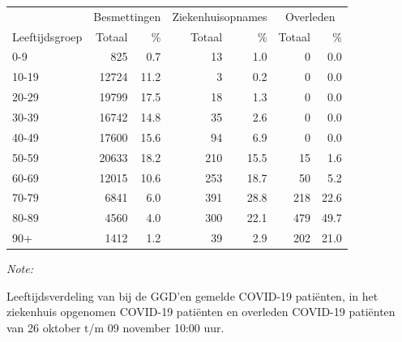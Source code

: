 \documentclass[
  english,
  man,floatsintext]{apa6}
\begin{document}
\begin{table}[H]
\centering\begingroup\fontsize{11}{13}\selectfont

\begin{threeparttable}
\begin{tabular}{lrrrrrr}
\toprule
\multicolumn{1}{c}{ } & \multicolumn{2}{c}{Besmettingen} & \multicolumn{2}{c}{Ziekenhuisopnames} & \multicolumn{2}{c}{Overleden} \\
\cmidrule(l{3pt}r{3pt}){2-3} \cmidrule(l{3pt}r{3pt}){4-5} \cmidrule(l{3pt}r{3pt}){6-7}
Leeftijdsgroep & Totaal & \% & Totaal & \% & Totaal & \%\\
\midrule
0-9 & 825 & 0.7 & 13 & 1.0 & 0 & 0.0\\
10-19 & 12724 & 11.2 & 3 & 0.2 & 0 & 0.0\\
20-29 & 19799 & 17.5 & 18 & 1.3 & 0 & 0.0\\
30-39 & 16742 & 14.8 & 35 & 2.6 & 0 & 0.0\\
40-49 & 17600 & 15.6 & 94 & 6.9 & 0 & 0.0\\
50-59 & 20633 & 18.2 & 210 & 15.5 & 15 & 1.6\\
60-69 & 12015 & 10.6 & 253 & 18.7 & 50 & 5.2\\
70-79 & 6841 & 6.0 & 391 & 28.8 & 218 & 22.6\\
80-89 & 4560 & 4.0 & 300 & 22.1 & 479 & 49.7\\
90+ & 1412 & 1.2 & 39 & 2.9 & 202 & 21.0\\
\bottomrule
\end{tabular}
\begin{tablenotes}
\item \textit{Note: } 
\item Leeftijdsverdeling van bij de GGD’en gemelde COVID-19 patiënten, in het ziekenhuis opgenomen COVID-19 patiënten en overleden COVID-19 patiënten van 26 oktober t/m 09 november 10:00 uur.
\end{tablenotes}
\end{threeparttable}
\endgroup{}
\end{table}
\end{document}
